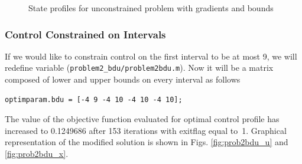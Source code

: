 \begin{figure}[htb]
\begin{minipage}[t]{0.5\linewidth}
\caption[Tutorial example 3: state profiles]{State profiles for
  unconstrained problem with gradients and bounds} \label{fig:prob2_x}
\end{minipage}
\end{figure}

\subsubsection{Control Constrained on Intervals}
If we would like to constrain control on the first interval to be at
most 9, we will redefine variable 
(\verb+problem2_bdu/problem2bdu.m+).  Now it will be a matrix composed
of lower and upper bounds on every interval as follows
\begin{verbatim}
optimparam.bdu = [-4 9 -4 10 -4 10 -4 10]; 
\end{verbatim}

The value of the objective function evaluated for optimal control
profile has increased to 0.1249686 after 153 iterations with exitflag
equal to~1. Graphical representation of the modified solution is shown in Figs. \ref{fig:prob2bdu_u} and
\ref{fig:prob2bdu_x}.


